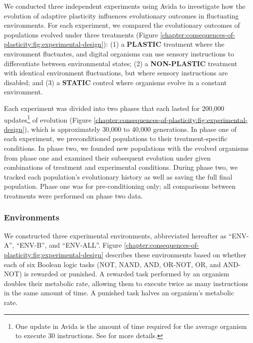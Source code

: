 We conducted three independent experiments using Avida to investigate how the evolution of adaptive plasticity influences evolutionary outcomes in fluctuating environments.
For each experiment, we compared the evolutionary outcomes of populations evolved under three treatments (Figure \ref{chapter:consequences-of-plasticity:fig:experimental-design}): 
(1) a \textbf{PLASTIC} treatment where the environment fluctuates, and digital organisms can use sensory instructions to differentiate between environmental states;
(2) a \textbf{NON-PLASTIC} treatment with identical environment fluctuations, but where sensory instructions are disabled;
and (3) a \textbf{STATIC} control where organisms evolve in a constant environment.

Each experiment was divided into two phases that each lasted for 200,000 updates\footnote{
    One update in Avida is the amount of time required for the average organism to execute 30 instructions. 
    See \citep{ofria_avida:_2009} for more details.
} of evolution (Figure \ref{chapter:consequences-of-plasticity:fig:experimental-design}), which is approximately 30,000 to 40,000 generations.
In phase one of each experiment, we preconditioned populations to their treatment-specific conditions.
In phase two, we founded new populations with the evolved organisms from phase one and examined their subsequent evolution under given combinations of treatment and experimental conditions.
During phase two, we tracked each population's evolutionary history as well as saving the full final population.
Phase one was for pre-conditioning only; all comparisons between treatments were performed on phase two data.

\subsubsection{Environments}
\label{chapter:consequences-of-plasticity:sec:methods:experiment:environments}


We constructed three experimental environments, abbreviated hereafter as ``ENV-A'', ``ENV-B'', and ``ENV-ALL''.
Figure \ref{chapter:consequences-of-plasticity:fig:experimental-design} describes these environments based on whether each of six Boolean logic tasks (NOT, NAND, AND, OR-NOT, OR, and AND-NOT) is rewarded or punished.
A rewarded task performed by an organism doubles their metabolic rate, allowing them to execute twice as many instructions in the same amount of time.
A punished task halves an organism's metabolic rate. 

